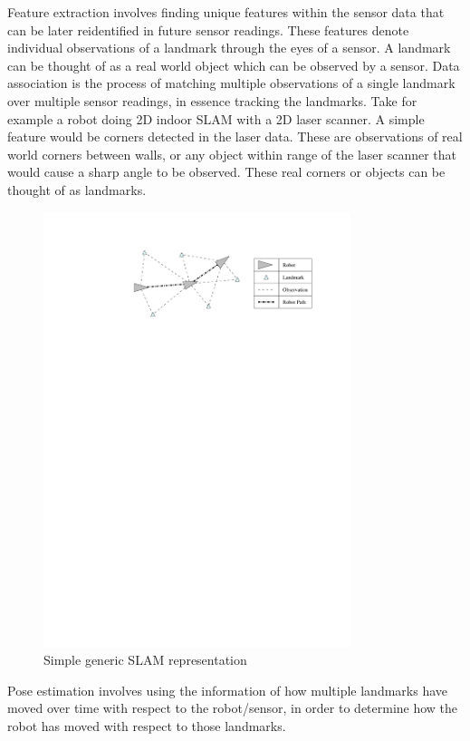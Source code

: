 Feature extraction involves finding unique features within the sensor data that can be later reidentified in future sensor readings.  These features denote individual observations of a landmark through the eyes of a sensor.  A landmark can be thought of as a real world object which can be observed by a sensor.  Data association is the process of matching multiple observations of a single landmark over multiple sensor readings, in essence tracking the landmarks.  Take for example a robot doing 2D indoor SLAM with a 2D laser scanner.  A simple feature would be corners detected in the laser data.  These are observations of real world corners between walls, or any object within range of the laser scanner that would cause a sharp angle to be observed.  These real corners or objects can be thought of as landmarks.

\begin{figure}[h]
  \centering
    \includegraphics[width=0.8\textwidth]{chapters/images/2D_SLAM}
  \caption{Simple generic SLAM representation }
\end{figure}

Pose estimation involves using the information of how multiple landmarks have moved over time with respect to the robot/sensor, in order to determine how the robot has moved with respect to those landmarks.  

